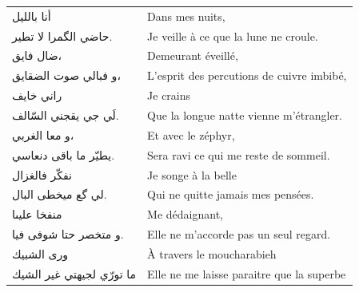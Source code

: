 \pagebreak
\begin{longtable}{R{0.3\textwidth} L{0.65\textwidth}}
  \endfirsthead


  \textarabic{أنا بالليل}                  &       Dans mes nuits,   \\  %
  \textarabic{حاضي الگمرا لا تطير.}         &       Je veille à ce que la lune ne croule.   \bigskip \\ 
  \textarabic{ضال فايق،}                   &       Demeurant éveillé,   \\  %
  \textarabic{و فبالي صوت الضقايق،}        &       L’esprit des percutions de cuivre imbibé,   \bigskip \\ 
  \textarabic{راني خايف}                   &       Je crains   \\  %
  \textarabic{لَي جي يقجني السّالف.}         &       Que la longue natte vienne m’étrangler.   \bigskip \\ 
  \textarabic{و معا الغربي،}               &       Et avec le zéphyr,   \\  %
  \textarabic{يطيّر ما باقى دنعاسي.}        &       Sera ravi ce qui me reste de sommeil.   \bigskip \\ 
  \textarabic{نفكّر فالغزال}                &       Je songe à la belle   \\  %
  \textarabic{لي گع ميخطى البال.}          &       Qui ne quitte jamais mes pensées.   \bigskip \\ 
  \textarabic{منفخا عليىا}                 &       Me dédaignant,   \\  %
  \textarabic{و متخصر حتا شوفى فيا.}       &       Elle ne m’accorde pas un seul regard.   \bigskip \\ 
  \textarabic{ورى الشبيك}                  &       À travers le moucharabieh   \\  %
  \textarabic{ما تورّي لجيهتي غير الشيك}    &       Elle ne me laisse paraitre que la superbe   \bigskip \\ 

\end{longtable}
